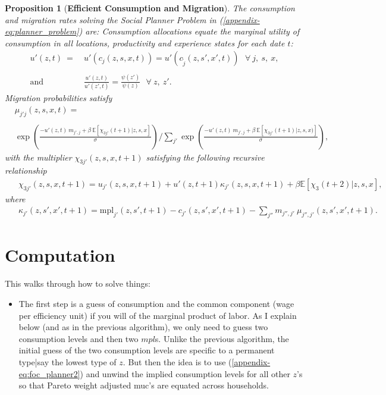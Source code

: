 \documentclass[12pt,pdftex]{article}
\newtheorem{proposition}{Proposition}
\begin{document}
\begin{onehalfspacing}
\begin{proposition}[\textbf{Efficient Consumption and Migration}] \label{apx-prp:efficient} The consumption and migration rates solving the Social Planner Problem in (\ref{appendix-eq:planner_problem}) are: Consumption allocations equate the marginal utility of consumption in all locations, productivity and experience states for each date $t$:
{\small
\begin{align}
u'(z, t) \ = \ & u'(c_{j}(z, s, x, t)) = u'(c_{\tilde{j}}(z, s', x', t)) \ \ \ \forall \ j, \ s, \ x, \\
\label{appendix-eq:foc_planner2}
\nonumber \\
\mbox{and} \ \ \ \ \ \ &\frac{u'(z, t)}{u'(z',t)} = \frac{\psi(z')}{\psi(z)} \ \ \ \forall \ z, \ z'.
\end{align}
}
Migration probabilities satisfy
{\footnotesize
\begin{align}
& \mu_{j'j}(z,s,x,t)  = \nonumber \\
\nonumber \\
& \exp \left(\frac{- u'(z,t) \ m_{j',j} + \beta \ \mathbb{E}\left[\chi_{3j'}(t+1)| z,s,x\right]}{\sigma} \right)  \Bigg / \sum_{j'} \exp \left( \frac{- u'(z, t)\ m_{j',j} + \beta \  \mathbb{E}\left[\chi_{3j'}(t+1)|z,s,x ) \right]}{\sigma} \right), \label{appendix-eq:migration_prob}
\end{align}
}
with the multiplier $\chi_{3j'}(z, s, x, t+1)$ satisfying the following recursive relationship
{\small
\begin{align}
& \ \ \chi_{3j'}(z, s, x, t+1) =  u_{j'}(z, s, x, t+1) +  u'(z, t+1) \kappa_{j'}(z, s,x,t+1) + \beta \mathbb{E}\left[\chi_{3}(t+2)|z, s, x  \right], \label{appendix-eq:dynamic_multiplier}
\end{align}}
where
{\small
\begin{align}
& \ \ \kappa_{j'}(z, s',x',t+1) = \mbox{mpl}_{j'}(z,s',t+1) - c_{j'}(z, s',x',t+1) - \sum_{j''}  m_{j'',j'} \ \mu_{j'',j'}(z, s', x', t+1). \label{appendix-eq:kappa}
\end{align}}
\end{proposition}

\section{Computation}

This walks through how to solve things:
\begin{itemize}
\item The first step is a guess of consumption and the common component (wage per efficiency unit) if you will of the marginal product of labor. As I explain below (and as in the previous algorithm), we only need to guess two consumption levels and then two $mpl$s. Unlike the previous algorithm, the initial guess of the two consumption levels are specific to a permanent type|say the lowest type of $z$. But then the idea is to use (\ref{appendix-eq:foc_planner2}) and unwind the implied consumption levels for all other $z$'s so that Pareto weight adjusted muc's are equated across households. 
    

\end{itemize}
\end{onehalfspacing}
\end{document}
